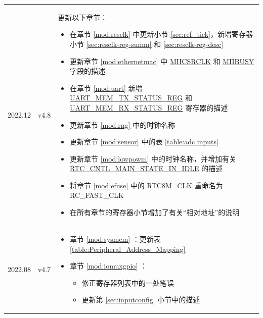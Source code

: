 \begin{longtable}[l]{ | m{2cm} | m{1.5cm} | m{12cm} | }
        \vspace{-1em}
    \\\hline
        2022.12   & v4.8 &
        \vspace{0.5em}
        更新以下章节：
        \begin{itemize}
            \item 在章节 \ref{mod:resclk} \textit{\nameref{mod:resclk}} 中更新小节 \ref{sec:ref_tick}，新增寄存器小节 \ref{sec:resclk-reg-summ} 和 \ref{sec:resclk-reg-desc}
            \item 更新章节 \ref{mod:ethernetmac} \textit{\nameref{mod:ethernetmac}} 中 \hyperref[fielddesc:MIICSRCLK]{MIICSRCLK} 和 \hyperref[fielddesc:MIIBUSY]{MIIBUSY} 字段的描述
            \item 在章节 \ref{mod:uart} \textit{\nameref{mod:uart}} 新增 \hyperref[regdesc:UARTMEMTXSTATUSREG]{UART\_MEM\_TX\_STATUS\_REG} 和 \hyperref[regdesc:UARTMEMRXSTATUSREG]{UART\_MEM\_RX\_STATUS\_REG} 寄存器的描述 %
            \item 更新章节 \ref{mod:rng} \textit{\nameref{mod:rng}} 中的时钟名称
            \item 更新章节 \ref{mod:sensor} \textit{\nameref{mod:sensor}} 中的表 \ref{table:adc inputs}
            \item 更新章节 \ref{mod:lowpowm} \textit{\nameref{mod:lowpowm}}  中的时钟名称，并增加有关 \hyperref[fielddesc:RTCCNTLMAINSTATEINIDLE]{RTC\_CNTL\_MAIN\_STATE\_IN\_IDLE} 的描述
            \item 将章节 \ref{mod:efuse} \textit{\nameref{mod:efuse}} 中的 RTC8M\_CLK 重命名为 RC\_FAST\_CLK
            \item 在所有章节的寄存器小节增加了有关“相对地址”的说明
            \vspace{-1em}
        \end{itemize}
        \\\hline
        2022.08   & v4.7 &
        \vspace{0.5em}
    \begin{itemize}
        \item 章节 \ref{mod:sysmem} \textit{\nameref{mod:sysmem}} ：更新表 \ref{table:Peripheral_Address_Mapping} %
        \item 章节 \ref{mod:iomuxgpio} \textit{\nameref{mod:iomuxgpio}}：
    \begin{itemize}
        \item 修正寄存器列表中的一处笔误 %
        \item 更新第 \ref{sec:inputconfig} 小节中的描述 %

\end{itemize}
\end{itemize}
\end{longtable}
